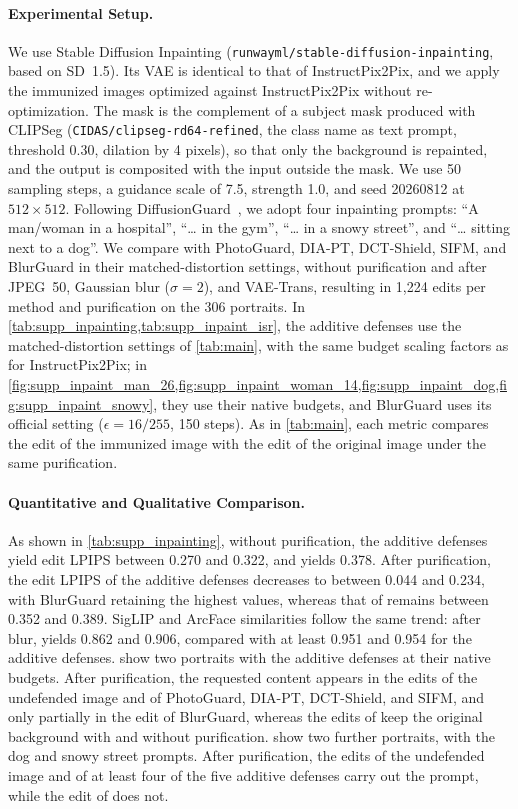 \paragraph{Experimental Setup.} We use Stable Diffusion Inpainting (\texttt{runwayml/stable-diffusion-inpainting}, based on SD~1.5). Its VAE is identical to that of InstructPix2Pix, and we apply the immunized images optimized against InstructPix2Pix without re-optimization. The mask is the complement of a subject mask produced with CLIPSeg (\texttt{CIDAS/clipseg-rd64-refined}, the class name as text prompt, threshold 0.30, dilation by 4 pixels), so that only the background is repainted, and the output is composited with the input outside the mask. We use 50 sampling steps, a guidance scale of 7.5, strength 1.0, and seed 20260812 at $512\times512$. Following DiffusionGuard~\cite{diffusionguard2025}, we adopt four inpainting prompts: ``A man/woman in a hospital'', ``\ldots{} in the gym'', ``\ldots{} in a snowy street'', and ``\ldots{} sitting next to a dog''. We compare \capg{} with PhotoGuard, DIA-PT, DCT-Shield, SIFM, and BlurGuard in their matched-distortion settings, without purification and after JPEG~50, Gaussian blur ($\sigma = 2$), and VAE-Trans, resulting in 1{,}224 edits per method and purification on the 306 portraits. In \cref{tab:supp_inpainting,tab:supp_inpaint_isr}, the additive defenses use the matched-distortion settings of \cref{tab:main}, with the same budget scaling factors as for InstructPix2Pix; in \cref{fig:supp_inpaint_man_26,fig:supp_inpaint_woman_14,fig:supp_inpaint_dog,fig:supp_inpaint_snowy}, they use their native budgets, and BlurGuard uses its official setting ($\epsilon = 16/255$, 150 steps). As in \cref{tab:main}, each metric compares the edit of the immunized image with the edit of the original image under the same purification.

\paragraph{Quantitative and Qualitative Comparison.} As shown in \cref{tab:supp_inpainting}, without purification, the additive defenses yield edit LPIPS between 0.270 and 0.322, and \capg{} yields 0.378. After purification, the edit LPIPS of the additive defenses decreases to between 0.044 and 0.234, with BlurGuard retaining the highest values, whereas that of \capg{} remains between 0.352 and 0.389. SigLIP and ArcFace similarities follow the same trend: after blur, \capg{} yields 0.862 and 0.906, compared with at least 0.951 and 0.954 for the additive defenses.  show two portraits with the additive defenses at their native budgets. After purification, the requested content appears in the edits of the undefended image and of PhotoGuard, DIA-PT, DCT-Shield, and SIFM, and only partially in the edit of BlurGuard, whereas the edits of \capg{} keep the original background with and without purification.  show two further portraits, with the dog and snowy street prompts. After purification, the edits of the undefended image and of at least four of the five additive defenses carry out the prompt, while the edit of \capg{} does not.

